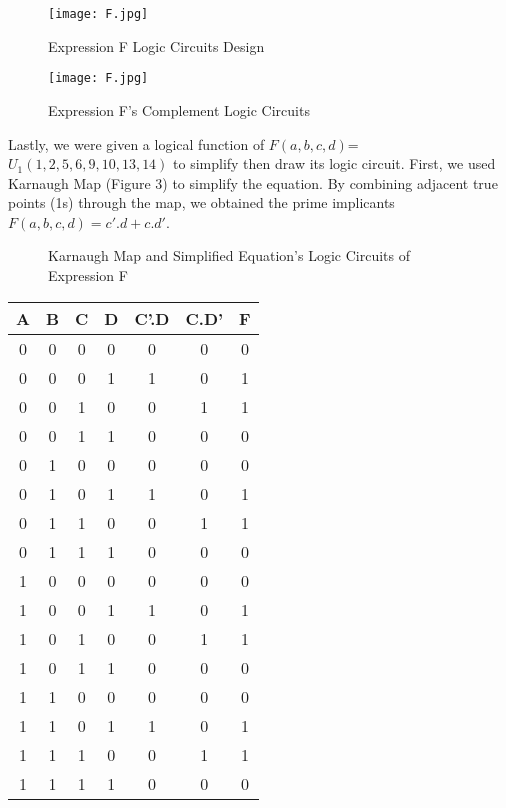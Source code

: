 \documentclass[pdftex,12pt,a4paper]{article}
\begin{document}
\begin{figure}[ht]
	\centering
	\texttt{[image: F.jpg]}	
	\caption{Expression F Logic Circuits Design}
	\label{fig1}
\end{figure}

\begin{figure}[ht]
	\centering
	\texttt{[image: F.jpg]}	
	\caption{Expression F's Complement Logic Circuits}
	\label{fig1}
\end{figure}


Lastly, we were given a logical function of \( F(a, b, c, d) \)= \(U_1(1, 2, 5, 6, 9, 10, 13, 14)\) to simplify then draw its logic circuit. First, we used Karnaugh Map (Figure 3) to simplify the equation. By combining adjacent true points (1s) through the map, we obtained the prime implicants \( F(a, b, c, d) = c'.d + c.d'\).


\begin{figure}%
    \centering
    \qquad
    \caption{Karnaugh Map and Simplified Equation's Logic Circuits of Expression F}%
    \label{fig:example}%
\end{figure}

\begin{center}
 \begin{tabular}{|c|c|c|c|c|c|c|} 
 \hline
 A & B & C & D & C'.D & C.D' & F \\ 
 \hline\hline
 0 & 0 & 0 & 0 & 0 & 0 & 0\\
 \hline
 0 & 0 & 0 & 1 & 1 & 0 & 1\\
 \hline
 0 & 0 & 1 & 0 & 0 & 1 & 1\\
 \hline
 0 & 0 & 1 & 1 & 0 & 0 & 0\\
 \hline
 0 & 1 & 0 & 0 & 0 & 0 & 0 \\ 
 \hline
 0 & 1 & 0 & 1 & 1 & 0 & 1 \\ 
 \hline
 0 & 1 & 1 & 0 & 0 & 1 & 1 \\ 
 \hline
 0 & 1 & 1 & 1 & 0 & 0 & 0 \\ 
 \hline
 1 & 0 & 0 & 0 & 0 & 0 & 0 \\ 
 \hline
 1 & 0 & 0 & 1 & 1 & 0 & 1 \\
 \hline
 1 & 0 & 1 & 0 & 0 & 1 & 1 \\
 \hline
 1 & 0 & 1 & 1 & 0 & 0 & 0 \\
 \hline
 1 & 1 & 0 & 0 & 0 & 0 & 0 \\ 
 \hline
 1 & 1 & 0 & 1 & 1 & 0 & 1 \\ 
 \hline
 1 & 1 & 1 & 0 & 0 & 1 & 1 \\ 
 \hline
 1 & 1 & 1 & 1 & 0 & 0 & 0 \\
 \hline
\end{tabular}
\end{center}
\end{document}
